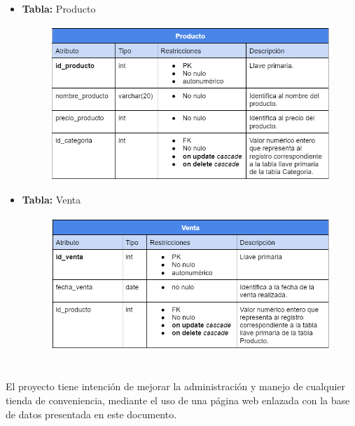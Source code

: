 \documentclass[10pt,a4paper]{article}
\begin{document}
\begin{itemize}
\pagebreak

	\item \textbf{Tabla:} Producto
			\begin{figure}[H]
				\includegraphics[scale=.54]{tablaProducto}
				\centering
				\label{img:tablaProducto}
			\end{figure} 
			
	\item \textbf{Tabla:} Venta
			\begin{figure}[H]
				\includegraphics[scale=.54]{tablaVenta}
				\centering
				\label{img:tablaVenta}
			\end{figure} 
\end{itemize}

\pagebreak

\section{\color{colorIPN}{Conclusión}}
El proyecto tiene intención de mejorar la administración y manejo de cualquier tienda de conveniencia, mediante el uso de una página web enlazada con la base de datos presentada en este documento. 
\end{document}
